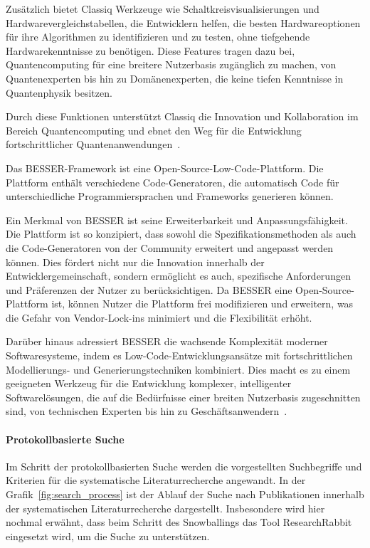Zusätzlich bietet Classiq Werkzeuge wie Schaltkreisvisualisierungen und Hardwarevergleichstabellen, die Entwicklern helfen, die 
besten Hardwareoptionen für ihre Algorithmen zu identifizieren und zu testen, ohne tiefgehende Hardwarekenntnisse zu benötigen. 
Diese Features tragen dazu bei, Quantencomputing für eine breitere Nutzerbasis zugänglich zu machen, von 
Quantenexperten bis hin zu Domänenexperten, die keine tiefen Kenntnisse in Quantenphysik besitzen.

Durch diese Funktionen unterstützt Classiq die Innovation und Kollaboration im Bereich Quantencomputing und ebnet den 
Weg für die Entwicklung fortschrittlicher Quantenanwendungen~\cite{minerbi2022quantum}. 

Das BESSER-Framework ist eine Open-Source-Low-Code-Plattform. Die Plattform enthält verschiedene Code-Generatoren, die automatisch Code 
für unterschiedliche Programmiersprachen und Frameworks generieren können. 

Ein Merkmal von BESSER ist seine Erweiterbarkeit und Anpassungsfähigkeit. Die Plattform ist so konzipiert, dass sowohl die 
Spezifikationsmethoden als auch die Code-Generatoren von der Community erweitert und angepasst werden können. Dies fördert 
nicht nur die Innovation innerhalb der Entwicklergemeinschaft, sondern ermöglicht es auch, spezifische Anforderungen und 
Präferenzen der Nutzer zu berücksichtigen. Da BESSER eine Open-Source-Plattform ist, können Nutzer die Plattform frei 
modifizieren und erweitern, was die Gefahr von Vendor-Lock-ins minimiert und die Flexibilität erhöht.

Darüber hinaus adressiert BESSER die wachsende Komplexität moderner Softwaresysteme, indem es Low-Code-Entwicklungsansätze mit 
fortschrittlichen Modellierungs- und Generierungstechniken kombiniert. Dies macht es zu einem geeigneten Werkzeug für die Entwicklung 
komplexer, intelligenter Softwarelösungen, die auf die Bedürfnisse einer breiten Nutzerbasis 
zugeschnitten sind, von technischen Experten bis hin zu Geschäftsanwendern~\cite{alfonso2024building}.

\paragraph{Protokollbasierte Suche}
Im Schritt der protokollbasierten Suche werden die vorgestellten Suchbegriffe und Kriterien für die systematische Literaturrecherche 
angewandt. 
In der Grafik~\ref{fig:search_process} ist der Ablauf der Suche nach Publikationen innerhalb der 
systematischen Literaturrecherche dargestellt. Insbesondere wird hier nochmal erwähnt, dass beim Schritt des 
Snowballings das Tool ResearchRabbit eingesetzt wird, um die Suche zu unterstützen. 

